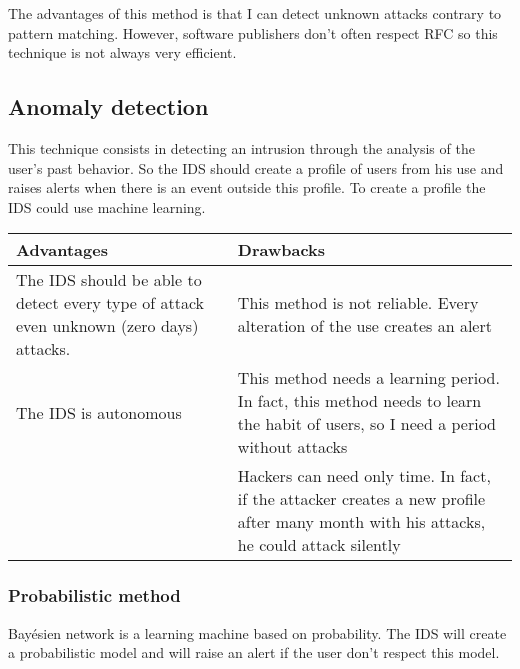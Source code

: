 The advantages of this method is that I can detect unknown attacks contrary to pattern matching. However,
software publishers don't often respect RFC so this technique is not always very efficient.





\subsection{Anomaly detection}

This technique consists in detecting an intrusion through the analysis of the user's past behavior. So the IDS should
create a profile of users from his use and raises alerts when there is an event outside this profile. To create a
profile the IDS could use machine learning.
~\\

\begin{tabular}{|p{}|p{}|} \hline
Advantages                                                                                                 & Drawbacks \\ \hline The IDS should be able to detect every type of
attack even unknown (zero days) attacks.                                                                   & This method is not reliable. Every
alteration of the use creates an alert                                                                                  \\
  \hline The IDS is autonomous                                                                             & This method
needs a learning period. In fact, this method needs to learn the habit of users,
so I need a period without attacks                                                                                    \\ \hline & Hackers can need only time. In fact,
if the attacker creates a new profile after many month with his attacks, he
could attack silently                                                                                                  \\ \hline

\end{tabular}


\subsubsection{Probabilistic method}
Bayésien network is a learning machine based on probability. The IDS will create a probabilistic model and will
raise an alert if the user don't respect this model.

